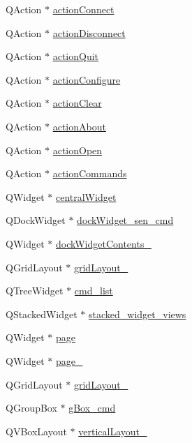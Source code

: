 \begin{DoxyCompactItemize}
\item 
Q\+Action $\ast$ \hyperlink{a00080_aa0785566311fc48271690fb68b1d4c5f}{action\+Connect}
\item 
Q\+Action $\ast$ \hyperlink{a00080_a8a16b3aef75b279eaaa887152d2f746b}{action\+Disconnect}
\item 
Q\+Action $\ast$ \hyperlink{a00080_a188c243f36a2dbc10e4e2a0ad94273b1}{action\+Quit}
\item 
Q\+Action $\ast$ \hyperlink{a00080_a3860abde3cfd3f6170e28fddde73f11e}{action\+Configure}
\item 
Q\+Action $\ast$ \hyperlink{a00080_ac8539dcd87955047877cb256aff60453}{action\+Clear}
\item 
Q\+Action $\ast$ \hyperlink{a00080_abdf2b43167c2cd0d3405f90b8c30e934}{action\+About}
\item 
Q\+Action $\ast$ \hyperlink{a00080_a5772f39001f62b7f601aafe72caa10c0}{action\+Open}
\item 
Q\+Action $\ast$ \hyperlink{a00080_a3dccdc21d3df68b86550093b5e3c0356}{action\+Commands}
\item 
Q\+Widget $\ast$ \hyperlink{a00080_a30075506c2116c3ed4ff25e07ae75f81}{central\+Widget}
\item 
Q\+Dock\+Widget $\ast$ \hyperlink{a00080_a9eb86a5ee396766f0f4a65f2d2bd7688}{dock\+Widget\+\_\+sen\+\_\+cmd}
\item 
Q\+Widget $\ast$ \hyperlink{a00080_a23b450a9debad2b0fecc6f063772caf2}{dock\+Widget\+Contents\+\_}
\item 
Q\+Grid\+Layout $\ast$ \hyperlink{a00080_a6b2a0c5f7e8ff2a87134908dd770d2d2}{grid\+Layout\+\_}
\item 
Q\+Tree\+Widget $\ast$ \hyperlink{a00080_aa66ece71395b435e915d384fb63bac1d}{cmd\+\_\+list}
\item 
Q\+Stacked\+Widget $\ast$ \hyperlink{a00080_a59e39bd3d716004e840a5be5dda18b96}{stacked\+\_\+widget\+\_\+views}
\item 
Q\+Widget $\ast$ \hyperlink{a00080_ad7d164376bef8649ee1f94697b859417}{page}
\item 
Q\+Widget $\ast$ \hyperlink{a00080_adcb6de4cebc6760fe319711f125010cc}{page\+\_}
\item 
Q\+Grid\+Layout $\ast$ \hyperlink{a00080_a8ee86315639f324b17708efc7dbe8b19}{grid\+Layout\+\_}
\item 
Q\+Group\+Box $\ast$ \hyperlink{a00080_ad5c6667239e28060ba3b04ee0db97bac}{g\+Box\+\_\+cmd}
\item 
Q\+V\+Box\+Layout $\ast$ \hyperlink{a00080_a93c190b085c63a667c535ba0bbcfec7c}{vertical\+Layout\+\_}

\end{DoxyCompactItemize}
